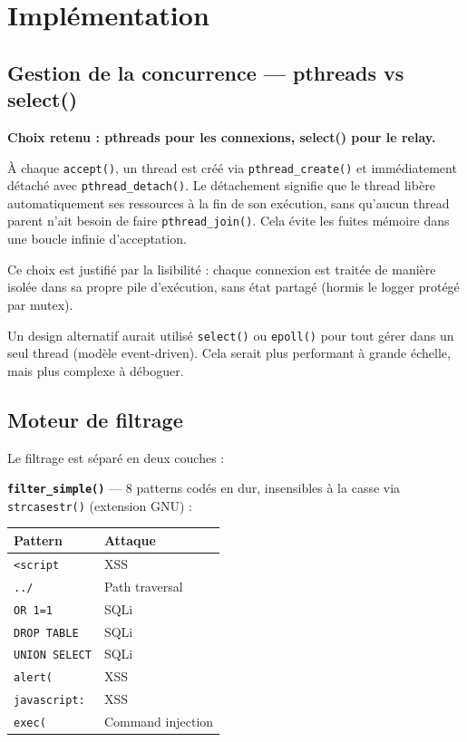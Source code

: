 \documentclass[12pt,a4paper]{article}
\begin{document}
\section{Implémentation}

\subsection{Gestion de la concurrence --- pthreads vs select()}

\textbf{Choix retenu : pthreads pour les connexions, select() pour le relay.}

À chaque \texttt{accept()}, un thread est créé via \texttt{pthread\_create()} et immédiatement détaché avec \texttt{pthread\_detach()}. Le détachement signifie que le thread libère automatiquement ses ressources à la fin de son exécution, sans qu'aucun thread parent n'ait besoin de faire \texttt{pthread\_join()}. Cela évite les fuites mémoire dans une boucle infinie d'acceptation.

Ce choix est justifié par la lisibilité : chaque connexion est traitée de manière isolée dans sa propre pile d'exécution, sans état partagé (hormis le logger protégé par mutex).

Un design alternatif aurait utilisé \texttt{select()} ou \texttt{epoll()} pour tout gérer dans un seul thread (modèle event-driven). Cela serait plus performant à grande échelle, mais plus complexe à déboguer.

\subsection{Moteur de filtrage}

Le filtrage est séparé en deux couches :

\textbf{\texttt{filter\_simple()}} --- 8 patterns codés en dur, insensibles à la casse via \texttt{strcasestr()} (extension GNU) :

\begin{tabular}{ll}
  \toprule
  \textbf{Pattern} & \textbf{Attaque} \\
  \midrule
  \texttt{<script}      & XSS \\
  \texttt{../}          & Path traversal \\
  \texttt{OR 1=1}       & SQLi \\
  \texttt{DROP TABLE}   & SQLi \\
  \texttt{UNION SELECT} & SQLi \\
  \texttt{alert(}       & XSS \\
  \texttt{javascript:}  & XSS \\
  \texttt{exec(}        & Command injection \\
  \bottomrule
\end{tabular}
\end{document}
